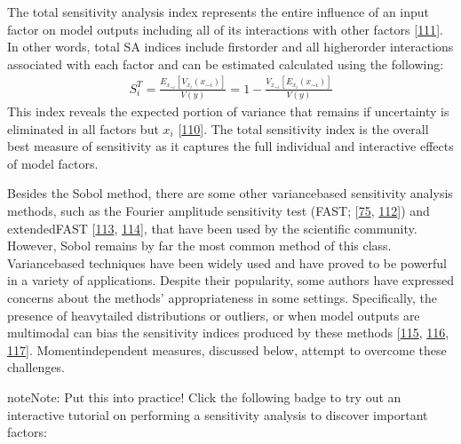 \documentclass[letterpaper,10pt,english]{book}
\begin{document}
\sphinxAtStartPar
The total sensitivity analysis index represents the entire influence of an input factor on model outputs including all of its interactions with other factors {[}\hyperlink{cite.index:id150}{111}{]}. In other words, total SA indices include first\sphinxhyphen{}order and all higher\sphinxhyphen{}order interactions associated with each factor and can be estimated calculated using the following:
\begin{equation*}
\begin{split}S_i^T= \frac{E_{x_{\sim i}}[V_{x_i}(x_{\sim i})]}{V(y)} = 1 - \frac{V_{x_{\sim i}}[E_{x_{i}}(x_{\sim i})]}{V(y)}\end{split}
\end{equation*}
\sphinxAtStartPar
This index reveals the expected portion of variance that remains if uncertainty is eliminated in all factors but \(x_i\) {[}\hyperlink{cite.index:id149}{110}{]}. The total sensitivity index is the overall best measure of sensitivity as it captures the full individual and interactive effects of model factors.

\sphinxAtStartPar
Besides the Sobol method, there are some other variance\sphinxhyphen{}based sensitivity analysis methods, such as the Fourier amplitude sensitivity test (FAST; {[}\hyperlink{cite.index:id100}{75}, \hyperlink{cite.index:id151}{112}{]}) and extended\sphinxhyphen{}FAST {[}\hyperlink{cite.index:id152}{113}, \hyperlink{cite.index:id153}{114}{]}, that have been used by the scientific community. However, Sobol remains by far the most common method of this class. Variance\sphinxhyphen{}based techniques have been widely used and have proved to be powerful in a variety of applications. Despite their popularity, some authors have expressed concerns about the methods’ appropriateness in some settings. Specifically, the presence of heavy\sphinxhyphen{}tailed distributions or outliers, or when model outputs are multimodal can bias the sensitivity indices produced by these methods {[}\hyperlink{cite.index:id154}{115}, \hyperlink{cite.index:id155}{116}, \hyperlink{cite.index:id156}{117}{]}. Moment\sphinxhyphen{}independent measures, discussed below, attempt to overcome these challenges.

\begin{sphinxadmonition}{note}{Note:}
\sphinxAtStartPar
Put this into practice! Click the following badge to try out an interactive tutorial on performing a sensitivity analysis to discover important factors:  
\end{sphinxadmonition}
\end{document}
